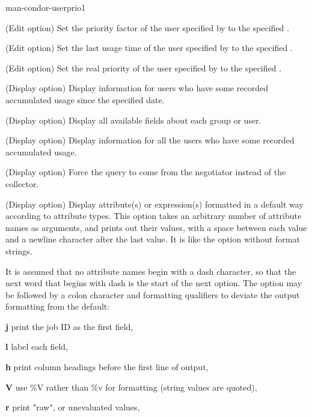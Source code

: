 \begin{ManPage}{}{man-condor-userprio}{1}
\begin{Options}
  {(Edit option) Set the priority factor of the user specified by
   to the specified .  }

  {(Edit option) Set the last usage time of the user specified by
   to the specified .  }

  {(Edit option) Set the real priority of the user specified by
   to the specified .  }

  {(Display option) Display information for users who have 
  some recorded accumulated usage since the specified date.  }

  {(Display option) Display all available fields about each group or user.}

  {(Display option) Display information for all the users 
  who have some recorded accumulated usage.}

  {(Display option) Force the query to come from the negotiator
   instead of the collector.}

   {
    (Display option) Display attribute(s) or expression(s)
    formatted in a default way according to attribute types.  
    This option takes an arbitrary number of attribute names as arguments,
    and prints out their values, 
    with a space between each value and a newline character after 
    the last value.  
    It is like the  option without format strings.

    It is assumed that no attribute names begin with a dash character,
    so that the next word that begins with dash is the 
    start of the next option.
    The  option may be followed by a colon character
    and formatting qualifiers to deviate the output formatting from
    the default:

    \textbf{j} print the job ID as the first field,

    \textbf{l} label each field,

    \textbf{h} print column headings before the first line of output,

    \textbf{V} use \%V rather than \%v for formatting (string values
    are quoted),

    \textbf{r} print "raw", or unevaluated values,

}
\end{Options}
\end{ManPage}
